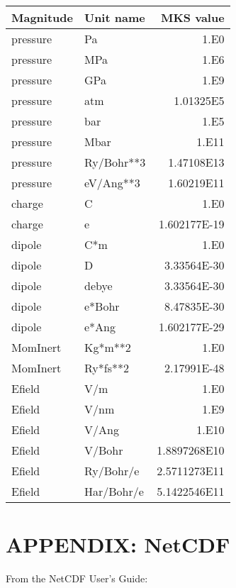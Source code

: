\documentclass[11pt]{article}
\begin{document}
\begin{center}
\begin{tabular}{llr}
Magnitude & Unit name & MKS value \\
\hline  
pressure & Pa         & 1.E0 \\
pressure & MPa        & 1.E6 \\
pressure & GPa        & 1.E9 \\
pressure & atm        & 1.01325E5 \\
pressure & bar        & 1.E5 \\
pressure & Mbar       & 1.E11 \\
pressure & Ry/Bohr**3 & 1.47108E13 \\
pressure & eV/Ang**3  & 1.60219E11 \\
charge   & C          & 1.E0 \\
charge   & e          & 1.602177E-19 \\
dipole   & C*m        & 1.E0 \\
dipole   & D          & 3.33564E-30 \\
dipole   & debye      & 3.33564E-30 \\
dipole   & e*Bohr     & 8.47835E-30 \\
dipole   & e*Ang      & 1.602177E-29 \\
MomInert & Kg*m**2    & 1.E0 \\
MomInert & Ry*fs**2   & 2.17991E-48 \\
Efield   & V/m        & 1.E0 \\
Efield   & V/nm       & 1.E9  \\
Efield   & V/Ang      & 1.E10 \\
Efield   & V/Bohr     & 1.8897268E10 \\
Efield   & Ry/Bohr/e  & 2.5711273E11 \\
Efield   & Har/Bohr/e & 5.1422546E11 \\
\hline
\end{tabular}
\end{center}

\newpage
\section{APPENDIX: NetCDF}
From the NetCDF User's Guide:
\end{document}
